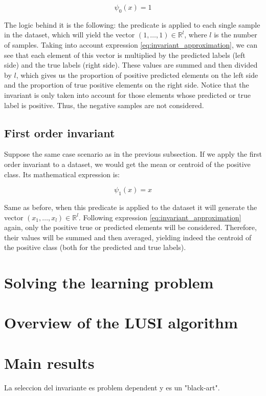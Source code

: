 \[
    \psi_0(x) = 1
\]

The logic behind it is the following: the predicate is applied to each single sample in the dataset,
which will yield the vector $(1, \dots, 1) \in \mathbb{R}^l $, where $l$ is the number of samples. Taking into account
expression \eqref{eq:invariant_approximation}, we can see that each element of this vector is multiplied
by the predicted labels (left side) and the true labels (right side). These values are summed and then divided
by $l$, which gives us the proportion of positive predicted elements on the left side and the proportion
of true positive elements on the right side. Notice that the invariant is only taken into account for those
elements whose predicted or true label is positive. Thus, the negative samples are not considered.

\subsection{First order invariant}

Suppose the same case scenario as in the previous subsection. If we apply the first order invariant to
a dataset, we would get the mean or centroid of the positive class. Its mathematical expression is:

\[
    \psi_1(x) = x
\]

Same as before, when this predicate is applied to the dataset it will generate the vector
$(x_1, \dots, x_l) \in \mathbb{R}^l$. Following expression \eqref{eq:invariant_approximation} again,
only the positive true or predicted elements will be considered. Therefore, their values will be summed and
then averaged, yielding indeed the centroid of the positive class (both for the predicted and true labels).

\section{Solving the learning problem}



\section{Overview of the LUSI algorithm}

\section{Main results}

La seleccion del invariante es problem dependent y es un "black-art".
